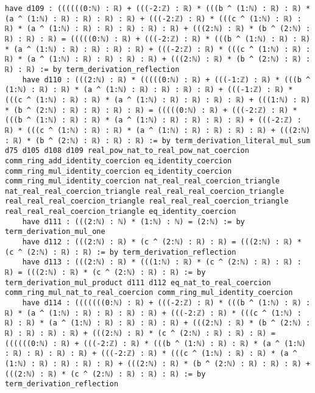 \documentclass{article}
\begin{document}
\begin{tcolorbox}[colback=white!10, width=\linewidth]
\begin{lstlisting}[language=Lean4]
    have d109 : ((((((0:ℕ) : ℝ) + (((-2:ℤ) : ℝ) * (((b ^ (1:ℕ) : ℝ) : ℝ) * (a ^ (1:ℕ) : ℝ) : ℝ) : ℝ) : ℝ) + (((-2:ℤ) : ℝ) * (((c ^ (1:ℕ) : ℝ) : ℝ) * (a ^ (1:ℕ) : ℝ) : ℝ) : ℝ) : ℝ) : ℝ) + (((2:ℕ) : ℝ) * (b ^ (2:ℕ) : ℝ) : ℝ) : ℝ) = (((((0:ℕ) : ℝ) + (((-2:ℤ) : ℝ) * (((b ^ (1:ℕ) : ℝ) : ℝ) * (a ^ (1:ℕ) : ℝ) : ℝ) : ℝ) : ℝ) + (((-2:ℤ) : ℝ) * (((c ^ (1:ℕ) : ℝ) : ℝ) * (a ^ (1:ℕ) : ℝ) : ℝ) : ℝ) : ℝ) + (((2:ℕ) : ℝ) * (b ^ (2:ℕ) : ℝ) : ℝ) : ℝ) := by term_derivation_reflection
    have d110 : (((2:ℕ) : ℝ) * (((((0:ℕ) : ℝ) + (((-1:ℤ) : ℝ) * (((b ^ (1:ℕ) : ℝ) : ℝ) * (a ^ (1:ℕ) : ℝ) : ℝ) : ℝ) : ℝ) + (((-1:ℤ) : ℝ) * (((c ^ (1:ℕ) : ℝ) : ℝ) * (a ^ (1:ℕ) : ℝ) : ℝ) : ℝ) : ℝ) + (((1:ℕ) : ℝ) * (b ^ (2:ℕ) : ℝ) : ℝ) : ℝ) : ℝ) = (((((0:ℕ) : ℝ) + (((-2:ℤ) : ℝ) * (((b ^ (1:ℕ) : ℝ) : ℝ) * (a ^ (1:ℕ) : ℝ) : ℝ) : ℝ) : ℝ) + (((-2:ℤ) : ℝ) * (((c ^ (1:ℕ) : ℝ) : ℝ) * (a ^ (1:ℕ) : ℝ) : ℝ) : ℝ) : ℝ) + (((2:ℕ) : ℝ) * (b ^ (2:ℕ) : ℝ) : ℝ) : ℝ) := by term_derivation_literal_mul_sum d75 d105 d108 d109 real_pow_nat_to_real_pow_nat_coercion comm_ring_add_identity_coercion eq_identity_coercion comm_ring_mul_identity_coercion eq_identity_coercion comm_ring_mul_identity_coercion nat_real_real_coercion_triangle nat_real_real_coercion_triangle real_real_real_coercion_triangle real_real_real_coercion_triangle real_real_real_coercion_triangle real_real_real_coercion_triangle eq_identity_coercion
    have d111 : (((2:ℕ) : ℕ) * (1:ℕ) : ℕ) = (2:ℕ) := by term_derivation_mul_one
    have d112 : (((2:ℕ) : ℝ) * (c ^ (2:ℕ) : ℝ) : ℝ) = (((2:ℕ) : ℝ) * (c ^ (2:ℕ) : ℝ) : ℝ) := by term_derivation_reflection
    have d113 : (((2:ℕ) : ℝ) * (((1:ℕ) : ℝ) * (c ^ (2:ℕ) : ℝ) : ℝ) : ℝ) = (((2:ℕ) : ℝ) * (c ^ (2:ℕ) : ℝ) : ℝ) := by term_derivation_mul_product d111 d112 eq_nat_to_real_coercion comm_ring_mul_nat_to_real_coercion comm_ring_mul_identity_coercion
    have d114 : (((((((0:ℕ) : ℝ) + (((-2:ℤ) : ℝ) * (((b ^ (1:ℕ) : ℝ) : ℝ) * (a ^ (1:ℕ) : ℝ) : ℝ) : ℝ) : ℝ) + (((-2:ℤ) : ℝ) * (((c ^ (1:ℕ) : ℝ) : ℝ) * (a ^ (1:ℕ) : ℝ) : ℝ) : ℝ) : ℝ) + (((2:ℕ) : ℝ) * (b ^ (2:ℕ) : ℝ) : ℝ) : ℝ) : ℝ) + (((2:ℕ) : ℝ) * (c ^ (2:ℕ) : ℝ) : ℝ) : ℝ) = ((((((0:ℕ) : ℝ) + (((-2:ℤ) : ℝ) * (((b ^ (1:ℕ) : ℝ) : ℝ) * (a ^ (1:ℕ) : ℝ) : ℝ) : ℝ) : ℝ) + (((-2:ℤ) : ℝ) * (((c ^ (1:ℕ) : ℝ) : ℝ) * (a ^ (1:ℕ) : ℝ) : ℝ) : ℝ) : ℝ) + (((2:ℕ) : ℝ) * (b ^ (2:ℕ) : ℝ) : ℝ) : ℝ) + (((2:ℕ) : ℝ) * (c ^ (2:ℕ) : ℝ) : ℝ) : ℝ) := by term_derivation_reflection

\end{lstlisting}
\end{tcolorbox}
\end{document}
